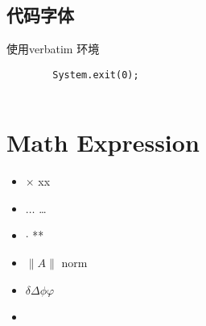 \documentclass[utf8]{ctexart}
\begin{document}
		\subsection{代码字体}
		\noindent	 
		使用verbatim 环境 

		\begin{verbatim}
		System.exit(0);
				
		\end{verbatim}
		\section{Math Expression}
		\begin{itemize}
				\item $\times $ xx
				\item $\ldots$ \ldots
				\item $\cdot $ **
				\item $\|A\| $ norm
				\item	$\delta \Delta \phi \varphi$
				\item 
					
						



		\end{itemize}
		
\end{document}
